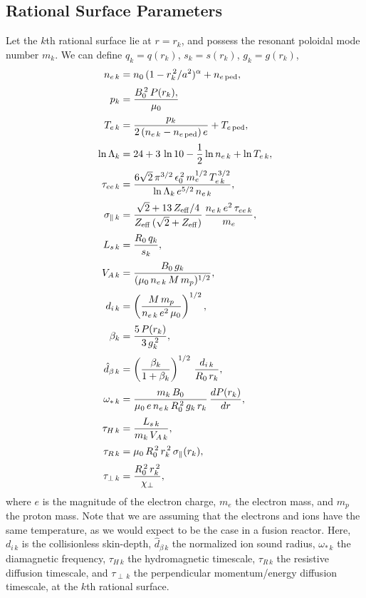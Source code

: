 \documentclass[12pt,prb,aps]{revtex4-1}
\begin{document}
\subsection{Rational Surface Parameters}\label{rpara}
Let the $k$th rational surface  lie at $r=r_k$, and possess the resonant poloidal mode number $m_k$. 
We can define  $q_k = q(r_k)$,  $s_k= s(r_k)$, $g_k = g(r_k)$, 
\begin{align}
n_{e\,k} &= n_0\,(1-r_k^{\,2}/a^2)^\alpha + n_{e\,\rm ped},\\[0.5ex]
p_k &= \frac{B_0^{\,2}\,P(r_k),}{\mu_0}\\[0.5ex]
T_{e\,k} &= \frac{p_k}{2\,(n_{e\,k}-n_{e\,{\rm ped}})\,e} + T_{e\,{\rm ped}},\\[0.5ex]
\ln{\Lambda}_k &= 24 + 3\,\ln 10-\frac{1}{2}\ln n_{e\,k} + \ln T_{e\,k},\\[0.5ex]
\tau_{ee\,k}&= \frac{6\sqrt{2}\,\pi^{3/2}\,\epsilon_0^{\,2}\,m_e^{1/2}\,T_{e\,k}^{\,3/2}}{\ln{\Lambda}_k\,e^{5/2}\,n_{e\,k}},\\[0.5ex]
\sigma_{\parallel\,k} &= \frac{\sqrt{2}+13\,Z_{\rm eff}/4}{Z_{\rm eff}\,(\sqrt{2}+Z_{\rm eff})}\,\frac{n_{e\,k}\,e^2\,\tau_{ee\,k}}{m_e},\\[0.5ex]
L_{s\,k} &= \frac{R_0\,q_k}{s_k},\\[0.5ex]
V_{A\,k} &= \frac{B_0\,g_k}{(\mu_0\,n_{e\,k}\,M\,m_p)^{1/2}},\\[0.5ex]
d_{i\,k} &= \left(\frac{M\,m_p}{n_{e\,k}\,e^2\,\mu_0}\right)^{1/2},\\[0.5ex]
\beta_k &= \frac{5\,P(r_k)}{3\,g_k^{\,2}},\\[0.5ex]
\hat{d}_{\beta\,k} &= \left(\frac{\beta_k}{1+\beta_k}\right)^{1/2}\,\frac{d_{i\,k}}{R_0\,r_k},\\[0.5ex]
\omega_{\ast\,k} &= \frac{m_k\,B_0}{\mu_0\,e\,n_{e\,k}\,R_0^{\,2}\,g_k\,r_k}\,\frac{dP(r_k)}{dr}, \\[0.5ex]
\tau_{H\,k} &= \frac{L_{s\,k}}{m_k\,V_{A\,k}},\\[0.5ex]
\tau_{R\,k} &= \mu_0\,R_0^{\,2}\,r_k^{\,2}\,\sigma_\parallel(r_k),\\[0.5ex]
\tau_{\perp\,k} &= \frac{R_0^{\,2}\,r_k^{\,2}}{\chi_\perp},
\end{align}
where $e$ is the magnitude of the electron charge, $m_e$ the electron mass, and $m_p$ the proton mass. 
Note that we are assuming that the electrons and ions have the same temperature, as we would expect to be the case in a fusion reactor. 
Here, $d_{i\,k}$ is the collisionless skin-depth, $\hat{d}_{\beta\,k}$ the normalized ion sound radius, $\omega_{\ast\,k}$ the diamagnetic frequency, 
$\tau_{H\,k}$ the hydromagnetic timescale, $\tau_{R\,k}$ the resistive diffusion timescale, and $\tau_{\perp\,k}$ the perpendicular momentum/energy diffusion timescale,
at the $k$th rational surface. 
\end{document}
